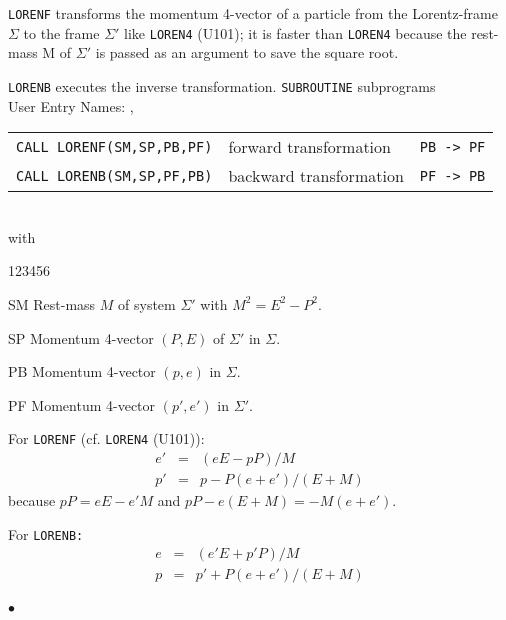                          
               
\Submitter{}                               
                   
{\tt LORENF} transforms the momentum 4-vector of a particle from the
Lorentz-frame $\Sigma$ to the frame $\Sigma '$ like {\tt LOREN4} (U101);
it is faster than {\tt LOREN4} because the rest-mass M of $\Sigma '$
is passed as an argument to save the square root.
\par
{\tt LORENB} executes the inverse transformation.
\Structure
{\tt SUBROUTINE} subprograms\\
User Entry Names: , 
\Usage
\begin{tabular}{@{\hspace*{10mm}}lll}
{\tt CALL LORENF(SM,SP,PB,PF)} & forward  transformation &
{\tt PB -> PF} \\
{\tt CALL LORENB(SM,SP,PF,PB)} & backward transformation &
{\tt PF -> PB}
\end{tabular} \\[3mm]
with
\begin{DLtt}{123456}
\item [SM] Rest-mass $M$ of system $\Sigma '$ with $M^2=E^2-P^2$.
\item [SP] Momentum 4-vector $(P,E)$ of $\Sigma '$ in $\Sigma$.
\item [PB] Momentum 4-vector $(p,e)$ in $\Sigma$.
\item [PF] Momentum 4-vector $(p',e')$ in $\Sigma '$.
\end{DLtt}
\Method
For {\tt LORENF} (cf. {\tt LOREN4} (U101)):
\begin{eqnarray*}
e' & = & (eE - pP)/M  \\
p' & = & p - P (e+e')/(E+M)
\end{eqnarray*}
because $pP=eE-e'M$ and $pP-e(E+M)=-M(e+e')$.
 
For {\tt LORENB:}
\begin{eqnarray*}
e & = & (e'E + p'P)/M \\
p & = & p' + P (e+e')/(E+M)
\end{eqnarray*}
\\ $\bullet$
